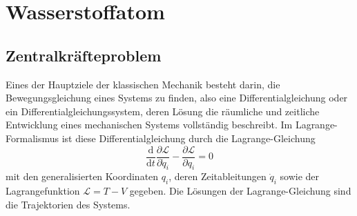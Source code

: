 \documentclass[9pt]{report}
\begin{document}
\newpage
\section{Wasserstoffatom}
\subsection{Zentralkräfteproblem}
Eines der Hauptziele der klassischen Mechanik besteht darin, die Bewegungsgleichung eines Systems zu finden, also eine Differentialgleichung oder ein Differentialgleichungssystem, deren Lösung die räumliche und zeitliche Entwicklung eines mechanischen Systems vollständig beschreibt. Im Lagrange-Formalismus ist diese Differentialgleichung durch die Lagrange-Gleichung
\begin{equation}
\frac{\mathrm{d}}{\mathrm{d}t}\frac{\partial\mathcal{L}}{\partial\dot{q}_i}-\frac{\partial\mathcal{L}}{\partial q_i}=0
\end{equation}
mit den generalisierten Koordinaten $q_i$, deren Zeitableitungen $\dot{q}_i$ sowie der Lagrangefunktion $\mathcal{L}=T-V$ gegeben. Die Lösungen der Lagrange-Gleichung sind die Trajektorien des Systems.
\end{document}
